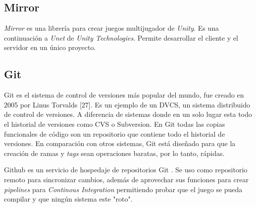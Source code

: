 \subsection{Mirror}
\textit{Mirror} es una librería para crear juegos multijugador de \textit{Unity}. Es una continuación a \textit{Unet} de \textit{Unity Technologies}. Permite desarrollar el cliente y el servidor en un único proyecto.

\subsection{Git}
Git es el sistema de control de versiones más popular del mundo, fue creado en 2005 por Linus Torvalds [27]. Es un ejemplo de un DVCS, un sistema distribuido de control de versiones. A diferencia de sistemas donde en un solo lugar esta todo el historial de versiones como CVS o Subversion. En Git todas las copias funcionales de código son un repositorio que contiene todo el historial de versiones.
En comparación con otros sistemas, Git está diseñado para que la creación de ramas y \textit{tags} sean operaciones baratas, por lo tanto, rápidas.

Github es un servicio de hospedaje de repositorios Git \cite{finley2012a}. Se uso como repositorio remoto para sincronizar cambios, además de aprovechar sus funciones para crear \textit{pipelines} para \textit{Continous Integration} permitiendo probar que el juego se pueda compilar y que ningún sistema este "roto".
